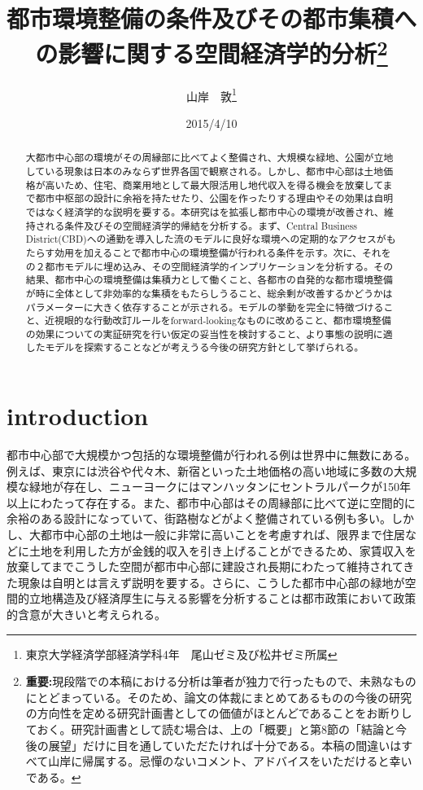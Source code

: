 \documentclass[a4paper]{jarticle}
\title{都市環境整備の条件及びその都市集積への影響に関する空間経済学的分析\thanks{\textbf{重要:}現段階での本稿における分析は筆者が独力で行ったもので、未熟なものにとどまっている。そのため、論文の体裁にまとめてあるものの今後の研究の方向性を定める研究計画書としての価値がほとんどであることをお断りしておく。研究計画書として読む場合は、上の「概要」と第8節の「結論と今後の展望」だけに目を通していただたければ十分である。本稿の間違いはすべて山岸に帰属する。忌憚のないコメント、アドバイスをいただけると幸いである。}}
\author{山岸　敦\thanks{東京大学経済学部経済学科4年　尾山ゼミ及び松井ゼミ所属}}
\date{2015/4/10}
\begin{document}
\maketitle

\begin{abstract}
大都市中心部の環境がその周縁部に比べてよく整備され、大規模な緑地、公園が立地している現象は日本のみならず世界各国で観察される。しかし、都市中心部は土地価格が高いため、住宅、商業用地として最大限活用し地代収入を得る機会を放棄してまで都市中枢部の設計に余裕を持たせたり、公園を作ったりする理由やその効果は自明ではなく経済学的な説明を要する。本研究は\citet{ottaviano02:aggl}を拡張し都市中心の環境が改善され、維持される条件及びその空間経済学的帰結を分析する。まず、Central Business District(CBD)への通勤を導入した\citet{tabuchi98:urba}流のモデルに良好な環境への定期的なアクセスがもたらす効用を加えることで都市中心の環境整備が行われる条件を示す。次に、それを\citet{ottaviano02:aggl}の２都市モデルに埋め込み、その空間経済学的インプリケーションを分析する。その結果、都市中心の環境整備は集積力として働くこと、各都市の自発的な都市環境整備が時に全体として非効率的な集積をもたらしうること、総余剰が改善するかどうかはパラメーターに大きく依存することが示される。モデルの挙動を完全に特徴づけること、近視眼的な行動改訂ルールをforward-lookingなものに改めること、都市環境整備の効果についての実証研究を行い仮定の妥当性を検討すること、より事態の説明に適したモデルを探索することなどが考えうる今後の研究方針として挙げられる。

\end{abstract}

\newpage{}

\section{introduction}
都市中心部で大規模かつ包括的な環境整備が行われる例は世界中に無数にある。例えば、東京には渋谷や代々木、新宿といった土地価格の高い地域に多数の大規模な緑地が存在し、ニューヨークにはマンハッタンにセントラルパークが150年以上にわたって存在する。また、都市中心部はその周縁部に比べて逆に空間的に余裕のある設計になっていて、街路樹などがよく整備されている例も多い。しかし、大都市中心部の土地は一般に非常に高いことを考慮すれば、限界まで住居などに土地を利用した方が金銭的収入を引き上げることができるため、家賃収入を放棄してまでこうした空間が都市中心部に建設され長期にわたって維持されてきた現象は自明とは言えず説明を要する。さらに、こうした都市中心部の緑地が空間的立地構造及び経済厚生に与える影響を分析することは都市政策において政策的含意が大きいと考えられる。
\end{document}
